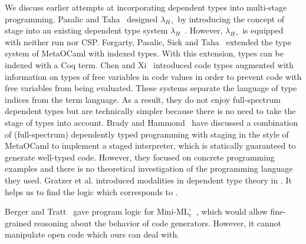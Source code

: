 
We discuss earlier attempts at incorporating dependent types into multi-stage
programming.  Pasalic and Taha~\cite{PasalicTahaSheard2002Tagless} designed
\(\lambda_{H\circ}\) by introducing the concept of stage into an existing
dependent type system \(\lambda_H\)~\cite{ShaoSahaTrifonovPapaspyrou2002Certified}.  However,
\(\lambda_{H\circ}\) is equipped with neither run nor CSP.  Forgarty, Pasalic,
Siek and Taha~\cite{FogartyPasalicSiekTaha2007Concoqtion} extended the type system of
MetaOCaml with indexed types.  With this extension, types can be indexed with a
Coq term.  Chen and Xi~\cite{ChenXi2003Meta} introduced code types augmented with
information on types of free variables in code values in order to prevent code
with free variables from being evaluated.  These systems separate the language
of type indices from the term language.  As a result, they do not enjoy
full-spectrum dependent types but are technically simpler because there is no
need to take the stage of types into account.  Brady and
Hammond~\cite{BradyHammond2006Dependently} have discussed a combination of
(full-spectrum) dependently typed programming with staging in the style of
MetaOCaml to implement a staged interpreter, which is statically guaranteed to
generate well-typed code.  However, they focused on concrete programming
examples and there is no theoretical investigation of the programming language
they used. Gratzer et al. introduced modalities in dependent type theory in
\cite{GratzerSterlingBirkedal2019ModalDependent}. It helps us to find the logic which
corresponds to \LMD.

Berger and Tratt~\cite{BergerTratt2015HGRTMP} gave program logic for
\(\text{Mini-ML}^\square_e\)~\cite{DaviesPfenning01JACM}, which would
allow fine-grained reasoning about the behavior of code generators.
However, it cannot manipulate open code which ours can deal with.


